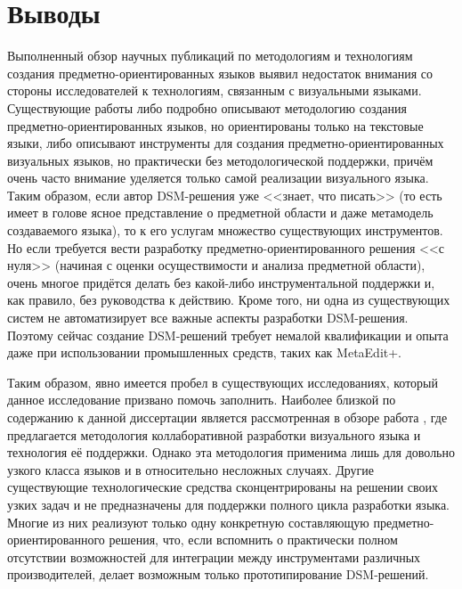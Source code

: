 \section{Выводы}
Выполненный обзор научных публикаций по методологиям и технологиям создания предметно-ориентированных 
языков выявил недостаток внимания со стороны исследователей к технологиям, связанным 
с визуальными языками. Существующие работы либо подробно описывают методологию создания 
предметно-ориентированных языков, но ориентированы только на текстовые языки, либо 
описывают инструменты для создания предметно-ориентированных визуальных языков, но 
практически без методологической поддержки, причём очень часто внимание уделяется 
только самой реализации визуального языка. Таким образом, если автор \ac{DSM}-решения уже 
<<знает, что писать>> (то есть имеет в голове ясное представление о предметной области 
и даже метамодель создаваемого языка), то к его услугам множество существующих инструментов. 
Но если требуется вести разработку предметно-ориентированного решения <<с нуля>> (начиная 
с оценки осуществимости и анализа предметной области), очень многое придётся делать 
без какой-либо инструментальной поддержки и, как правило, без руководства к действию.
Кроме того, ни одна из существующих систем не автоматизирует все важные аспекты разработки \ac{DSM}-решения.
Поэтому сейчас создание \ac{DSM}-решений требует немалой квалификации и опыта даже при 
использовании промышленных средств, таких как MetaEdit+.

Таким образом, явно имеется пробел в существующих исследованиях, который данное исследование
призвано помочь заполнить. Наиболее близкой по содержанию к данной диссертации является
рассмотренная в обзоре работа \cite{repenning1995agentsheets}, где предлагается методология
коллаборативной разработки визуального языка и технология её поддержки. Однако эта
методология применима лишь для довольно узкого класса языков и в относительно несложных
случаях. Другие существующие технологические средства сконцентрированы на решении
своих узких задач и не предназначены для поддержки полного цикла разработки языка.
Многие из них реализуют только одну конкретную составляющую предметно-ориентированного
решения, что, если вспомнить о практически полном отсутствии возможностей для интеграции
между инструментами различных производителей, делает возможным только прототипирование
\ac{DSM}-решений.
